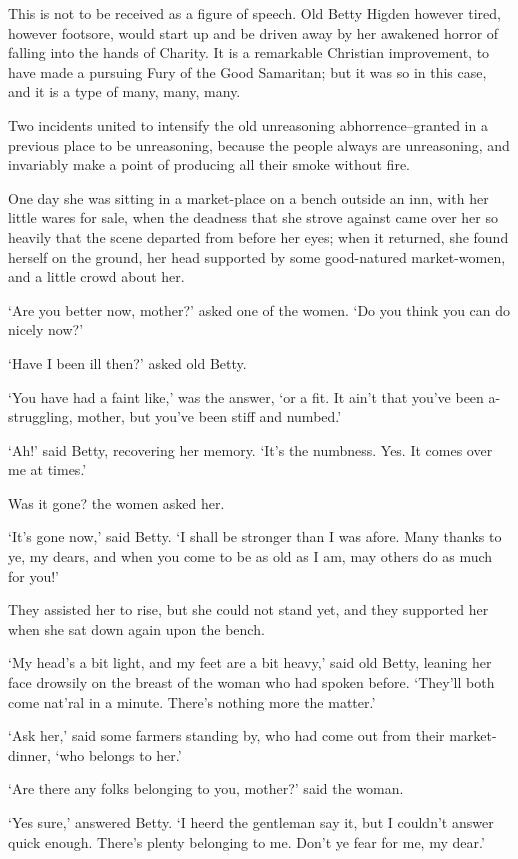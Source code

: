 This is not to be received as a figure of speech. Old Betty Higden
however tired, however footsore, would start up and be driven away
by her awakened horror of falling into the hands of Charity. It is a
remarkable Christian improvement, to have made a pursuing Fury of the
Good Samaritan; but it was so in this case, and it is a type of many,
many, many.

Two incidents united to intensify the old unreasoning
abhorrence--granted in a previous place to be unreasoning, because the
people always are unreasoning, and invariably make a point of producing
all their smoke without fire.

One day she was sitting in a market-place on a bench outside an inn,
with her little wares for sale, when the deadness that she strove
against came over her so heavily that the scene departed from before
her eyes; when it returned, she found herself on the ground, her head
supported by some good-natured market-women, and a little crowd about
her.

‘Are you better now, mother?’ asked one of the women. ‘Do you think you
can do nicely now?’

‘Have I been ill then?’ asked old Betty.

‘You have had a faint like,’ was the answer, ‘or a fit. It ain’t that
you’ve been a-struggling, mother, but you’ve been stiff and numbed.’

‘Ah!’ said Betty, recovering her memory. ‘It’s the numbness. Yes. It
comes over me at times.’

Was it gone? the women asked her.

‘It’s gone now,’ said Betty. ‘I shall be stronger than I was afore.
Many thanks to ye, my dears, and when you come to be as old as I am, may
others do as much for you!’

They assisted her to rise, but she could not stand yet, and they
supported her when she sat down again upon the bench.

‘My head’s a bit light, and my feet are a bit heavy,’ said old Betty,
leaning her face drowsily on the breast of the woman who had spoken
before. ‘They’ll both come nat’ral in a minute. There’s nothing more the
matter.’

‘Ask her,’ said some farmers standing by, who had come out from their
market-dinner, ‘who belongs to her.’

‘Are there any folks belonging to you, mother?’ said the woman.

‘Yes sure,’ answered Betty. ‘I heerd the gentleman say it, but I
couldn’t answer quick enough. There’s plenty belonging to me. Don’t ye
fear for me, my dear.’

